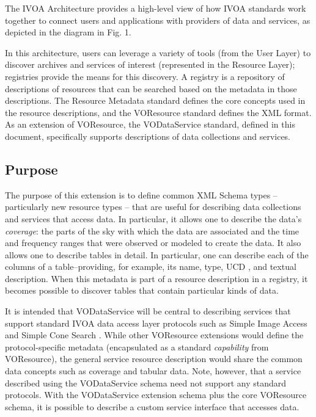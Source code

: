 \documentclass[11pt,a4paper]{ivoa}
\begin{document}
The IVOA Architecture \citep{note:VOARCH} provides a high-level
view of how IVOA standards work together to connect users and
applications with providers of data and services, as depicted in the
diagram in Fig. 1.

In this architecture, users can leverage a variety of tools (from the
User Layer) to discover archives and services of interest (represented
in the Resource Layer); registries provide the means for this
discovery.  A registry is a repository of descriptions of resources
that can be searched based on the metadata in those descriptions.  The
Resource Metadata standard \citep{2007ivoa.spec.0302H} defines the core
concepts used in the resource descriptions, and the VOResource
standard defines the XML format.  As an
extension of VOResource, the VODataService standard, defined in this
document, specifically supports descriptions of data collections and
services.  

\subsection{Purpose}


The purpose of this extension is to define common XML Schema
types -- particularly new resource types -- that are useful for describing
data collections and services that access data.  In particular, it
allows one to describe the data's \emph{coverage}:  the parts of the
sky with which the data are associated and the time and frequency ranges that
were observed or modeled to create the data.  It also allows one to
describe tables in detail.  In particular, one can describe each of
the columns of a table--providing, for example, its name, type, UCD
\citep{2005ivoa.spec.1231D}, 
and textual description.  When this metadata is part of a resource
description in a registry, it becomes possible
to discover tables that contain particular kinds of data.  



It is intended that VODataService will be central to describing
services that support standard IVOA data access layer protocols such
as Simple Image Access \citep{2015ivoa.spec.1223D} and Simple Cone Search
\citep{2008ivoa.specQ0222P}.  While other VOResource extensions would
define the protocol-specific metadata (encapsulated as a standard
\emph{capability} from VOResource), the general service
resource description would share the common data concepts such as
coverage and tabular data.  Note, however, that a service described
using the VODataService schema need not support any standard
protocols.  With the VODataService extension schema plus the core
VOResource schema, it is possible to describe a custom service
interface that accesses data.  
\end{document}
